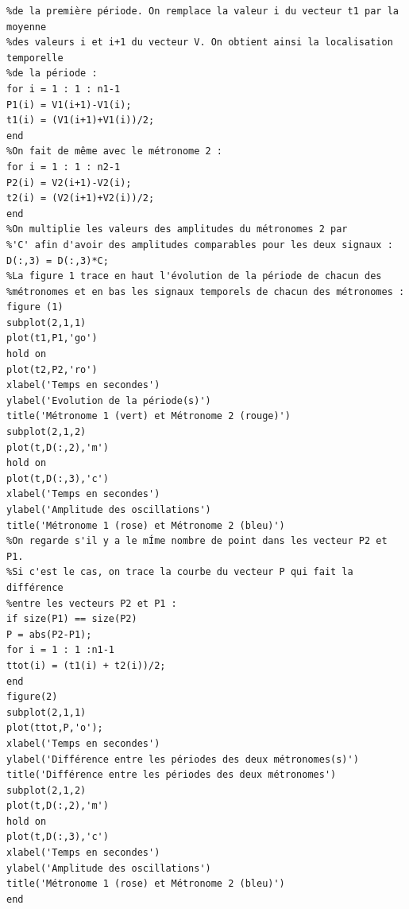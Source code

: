 \documentclass[a4paper,11pt]{report}
\begin{document}
\begin{verbatim}
%de la première période. On remplace la valeur i du vecteur t1 par la moyenne
%des valeurs i et i+1 du vecteur V. On obtient ainsi la localisation temporelle
%de la période :
for i = 1 : 1 : n1-1
P1(i) = V1(i+1)-V1(i);
t1(i) = (V1(i+1)+V1(i))/2;
end
%On fait de même avec le métronome 2 :
for i = 1 : 1 : n2-1
P2(i) = V2(i+1)-V2(i);
t2(i) = (V2(i+1)+V2(i))/2;
end
%On multiplie les valeurs des amplitudes du métronomes 2 par
%'C' afin d'avoir des amplitudes comparables pour les deux signaux :
D(:,3) = D(:,3)*C;
%La figure 1 trace en haut l'évolution de la période de chacun des
%métronomes et en bas les signaux temporels de chacun des métronomes :
figure (1)
subplot(2,1,1)
plot(t1,P1,'go')
hold on
plot(t2,P2,'ro')
xlabel('Temps en secondes')
ylabel('Evolution de la période(s)')
title('Métronome 1 (vert) et Métronome 2 (rouge)')
subplot(2,1,2)
plot(t,D(:,2),'m')
hold on
plot(t,D(:,3),'c')
xlabel('Temps en secondes')
ylabel('Amplitude des oscillations')
title('Métronome 1 (rose) et Métronome 2 (bleu)')
%On regarde s'il y a le mÍme nombre de point dans les vecteur P2 et P1.
%Si c'est le cas, on trace la courbe du vecteur P qui fait la différence
%entre les vecteurs P2 et P1 :
if size(P1) == size(P2)
P = abs(P2-P1);
for i = 1 : 1 :n1-1
ttot(i) = (t1(i) + t2(i))/2;
end
figure(2)
subplot(2,1,1)
plot(ttot,P,'o');
xlabel('Temps en secondes')
ylabel('Différence entre les périodes des deux métronomes(s)')
title('Différence entre les périodes des deux métronomes')
subplot(2,1,2)
plot(t,D(:,2),'m')
hold on
plot(t,D(:,3),'c')
xlabel('Temps en secondes')
ylabel('Amplitude des oscillations')
title('Métronome 1 (rose) et Métronome 2 (bleu)')
end
\end{verbatim}
\end{document}
